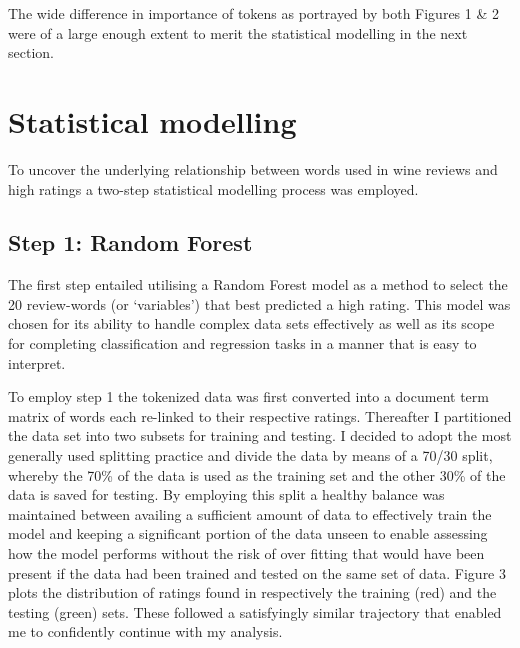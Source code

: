 \documentclass[11pt,preprint]{elsarticle}
\numberwithin{equation}{section}
\numberwithin{figure}{section}
\numberwithin{table}{section}
\begin{document}
The wide difference in importance of tokens as portrayed by both Figures
1 \& 2 were of a large enough extent to merit the statistical modelling
in the next section.

\newpage

\section{Statistical modelling}\label{statistical-modelling}

\label{StatMod} To uncover the underlying relationship between words
used in wine reviews and high ratings a two-step statistical modelling
process was employed.

\subsection{Step 1: Random Forest}\label{step-1-random-forest}

The first step entailed utilising a Random Forest model as a method to
select the 20 review-words (or `variables') that best predicted a high
rating. This model was chosen for its ability to handle complex data
sets effectively as well as its scope for completing classification and
regression tasks in a manner that is easy to interpret.

To employ step 1 the tokenized data was first converted into a document
term matrix of words each re-linked to their respective ratings.
Thereafter I partitioned the data set into two subsets for training and
testing. I decided to adopt the most generally used splitting practice
and divide the data by means of a 70/30 split, whereby the 70\% of the
data is used as the training set and the other 30\% of the data is saved
for testing. By employing this split a healthy balance was maintained
between availing a sufficient amount of data to effectively train the
model and keeping a significant portion of the data unseen to enable
assessing how the model performs without the risk of over fitting that
would have been present if the data had been trained and tested on the
same set of data. Figure 3 plots the distribution of ratings found in
respectively the training (red) and the testing (green) sets. These
followed a satisfyingly similar trajectory that enabled me to
confidently continue with my analysis.
\end{document}
